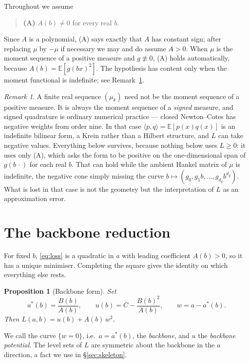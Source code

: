 \documentclass[11pt]{article}
\theoremstyle{plain}
\newtheorem{proposition}[theorem]{Proposition}
\theoremstyle{definition}
\theoremstyle{remark}
\newtheorem{remark}[theorem]{Remark}
\newcommand{\E}{\mathbb{E}}
\begin{document}
Throughout we assume

\begin{quote}
\textbf{(A)} \quad $A(b) \neq 0$ for every real $b$.
\end{quote}

Since $A$ is a polynomial, (A) says exactly that $A$ has constant sign; after
replacing $\mu$ by $-\mu$ if necessary we may and do assume $A > 0$. When $\mu$
is the moment sequence of a positive measure and $g \not\equiv 0$, (A) holds
automatically, because $A(b) = \E[g(bx)^2]$. The hypothesis has content only
when the moment functional is indefinite; see Remark~\ref{rem:krein}.

\begin{remark}\label{rem:krein}
A finite real sequence $(\mu_k)$ need not be the moment sequence of a positive
measure. It is always the moment sequence of a \emph{signed} measure, and
signed quadrature is ordinary numerical practice --- closed Newton--Cotes has
negative weights from order nine. In that case $\langle p, q\rangle =
\E[p(x)q(x)]$ is an indefinite bilinear form, a Krein rather than a Hilbert
structure, and $L$ can take negative values. Everything below survives, because
nothing below uses $L \geq 0$: it uses only (A), which asks the form to be
positive on the one-dimensional span of $g(b\,\cdot)$ for each real $b$. That
can hold while the ambient Hankel matrix of $\mu$ is indefinite, the negative
cone simply missing the curve $b \mapsto (g_0, g_1 b, \dots, g_{d_g}b^{d_g})$.
What is lost in that case is not the geometry but the interpretation of $L$ as
an approximation error.
\end{remark}

\section{The backbone reduction}

For fixed $b$, \eqref{eq:loss} is a quadratic in $a$ with leading coefficient
$A(b) > 0$, so it has a unique minimiser. Completing the square gives the
identity on which everything else rests.

\begin{proposition}[Backbone form]\label{prop:backbone}
Set
\[
  a^*(b) = \frac{B(b)}{A(b)}, \qquad
  u(b)   = C - \frac{B(b)^2}{A(b)}, \qquad
  w      = a - a^*(b).
\]
Then $L(a,b) = u(b) + A(b)\,w^2$.
\end{proposition}

We call the curve $\{w = 0\}$, i.e.\ $a = a^*(b)$, the \emph{backbone}, and
$u$ the \emph{backbone potential}. The level sets of $L$ are symmetric about
the backbone in the $a$ direction, a fact we use in \S\ref{sec:skeleton}.
\end{document}
